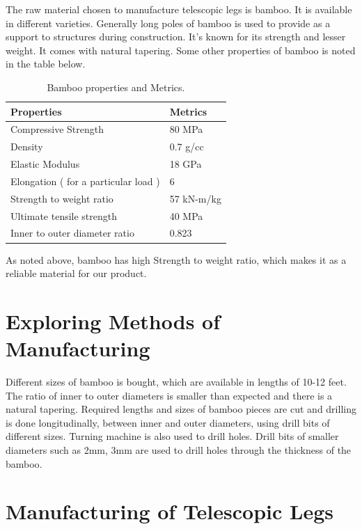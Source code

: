 The raw material chosen to manufacture telescopic legs is bamboo. It is available in different varieties. Generally long poles of bamboo is used to provide as a support to structures during construction. It’s known for its strength and lesser weight. It comes with natural tapering. Some other properties of bamboo is noted in the table below.

\begin{table}[h!]
  \centering
  \caption{Bamboo properties and Metrics.}
  \label{tab:table3}
  \begin{tabular}{l||l}
  	\hline
  	Properties & Metrics\\
    \hline
	Compressive Strength  & 80 MPa\\
	Density & 0.7 g/cc\\
	Elastic Modulus & 18 GPa\\
	Elongation ( for a particular load ) & 6\\
	Strength to weight ratio & 57 kN-m/kg\\
	Ultimate tensile strength & 40 MPa\\
	Inner to outer diameter ratio & 0.823\\

  \end{tabular}
\end{table}

As noted above, bamboo has high Strength to weight ratio, which makes it as a reliable material for our product. 

\section{Exploring Methods of Manufacturing}

Different sizes of bamboo is bought, which are available in lengths of 10-12 feet. The ratio of inner to outer diameters is smaller than expected and there is a natural tapering. Required lengths and sizes of bamboo pieces are cut  and drilling is done longitudinally, between inner and outer diameters, using drill bits of different sizes. Turning machine is also used to drill holes. Drill bits of smaller diameters such as 2mm, 3mm are used to drill holes through the thickness of the bamboo\cite{bamboo_flute}. 

\section{Manufacturing of Telescopic Legs}

